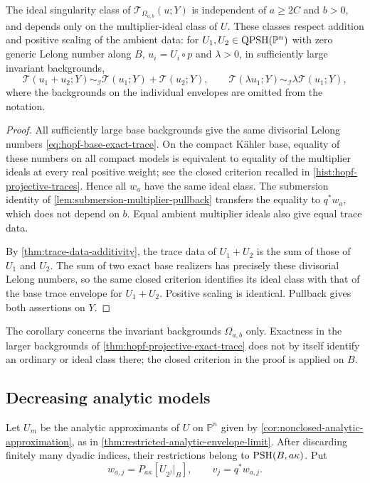 \begin{corollary}\label{cor:hopf-trace-ideal-class}
The ideal singularity class of $\mathcal T_{\Omega_{a,b}}(u;Y)$ is independent of $a\geq2C$ and $b>0$, and depends only on the multiplier-ideal class of $U$. These classes respect addition and positive scaling of the ambient data: for $U_1,U_2\in\mathrm{QPSH}(\mathbb P^n)$ with zero generic Lelong number along $B$, $u_i=U_i\circ p$ and $\lambda>0$, in sufficiently large invariant backgrounds,
\[
 \mathcal T(u_1+u_2;Y)\sim_{\mathcal I}
       \mathcal T(u_1;Y)+\mathcal T(u_2;Y),
 \qquad
 \mathcal T(\lambda u_1;Y)\sim_{\mathcal I}
       \lambda\mathcal T(u_1;Y),
\]
where the backgrounds on the individual envelopes are omitted from the notation.
\end{corollary}
\begin{proof}
All sufficiently large base backgrounds give the same divisorial Lelong numbers \eqref{eq:hopf-base-exact-trace}. On the compact K\"ahler base, equality of these numbers on all compact models is equivalent to equality of the multiplier ideals at every real positive weight; see the closed criterion recalled in \cref{hist:hopf-projective-traces}. Hence all $w_a$ have the same ideal class. The submersion identity of \cref{lem:submersion-multiplier-pullback} transfers the equality to $q^*w_a$, which does not depend on $b$. Equal ambient multiplier ideals also give equal trace data.

By \cref{thm:trace-data-additivity}, the trace data of $U_1+U_2$ is the sum of those of $U_1$ and $U_2$. The sum of two exact base realizers has precisely these divisorial Lelong numbers, so the same closed criterion identifies its ideal class with that of the base trace envelope for $U_1+U_2$. Positive scaling is identical. Pullback gives both assertions on $Y$.
\end{proof}

The corollary concerns the invariant backgrounds $\Omega_{a,b}$ only. Exactness in the larger backgrounds of \cref{thm:hopf-projective-exact-trace} does not by itself identify an ordinary or ideal class there; the closed criterion in the proof is applied on $B$.

\subsection{Decreasing analytic models}

Let $U_m$ be the analytic approximants of $U$ on $\mathbb P^n$ given by \cref{cor:nonclosed-analytic-approximation}, as in \cref{thm:restricted-analytic-envelope-limit}. After discarding finitely many dyadic indices, their restrictions belong to $\mathrm{PSH}(B,a\kappa)$. Put
\[
 w_{a,j}=P_{a\kappa}[U_{2^j}|_B],\qquad v_j=q^*w_{a,j}.
\]

